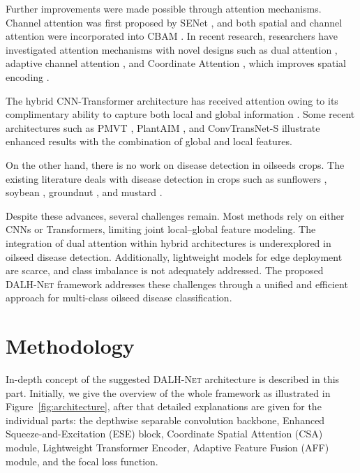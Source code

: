 \documentclass[default, iicol]{sn-jnl}
\theoremstyle{thmstyleone}%
\theoremstyle{thmstyletwo}%
\theoremstyle{thmstylethree}%
\newcommand{\dalh}{\textsc{DALH-Net}}
\begin{document}
Further improvements were made possible through attention mechanisms. Channel attention was first proposed by SENet \cite{hu2018squeeze}, and both spatial and channel attention were incorporated into CBAM \cite{woo2018cbam}. In recent research, researchers have investigated attention mechanisms with novel designs such as dual attention \cite{zhang2024lightweight}, adaptive channel attention \cite{ma2024ercp}, and Coordinate Attention \cite{hou2021coordinate}, which improves spatial encoding \cite{chen2021dfcanet}.

The hybrid CNN-Transformer architecture has received attention owing to its complimentary ability to capture both local and global information \cite{khan2023hybrid,vaswani2017attention}. Some recent architectures such as PMVT \cite{li2023pmvt}, PlantAIM \cite{chai2025plantaim}, and ConvTransNet-S \cite{lee2024convtransnet} illustrate enhanced results with the combination of global and local features.

On the other hand, there is no work on disease detection in oilseeds crops. The existing literature deals with disease detection in crops such as sunflowers \cite{dergi2024sunflower,sara2022sunflower}, soybean \cite{yu2023recognition,yang2024recognition}, groundnut \cite{sivaganesan2024groundnut,vyas2023groundnut}, and mustard \cite{zhao2024canola}.

Despite these advances, several challenges remain. Most methods rely on either CNNs or Transformers, limiting joint local–global feature modeling. The integration of dual attention within hybrid architectures is underexplored in oilseed disease detection. Additionally, lightweight models for edge deployment are scarce, and class imbalance is not adequately addressed. The proposed \dalh{} framework addresses these challenges through a unified and efficient approach for multi-class oilseed disease classification.


\section{Methodology}\label{sec:methodology}

In-depth concept of the suggested \dalh{} architecture is described in this part. Initially, we give the overview of the whole framework as illustrated in Figure~\ref{fig:architecture}, after that detailed explanations are given for the individual parts: the depthwise separable convolution backbone, Enhanced Squeeze-and-Excitation (ESE) block, Coordinate Spatial Attention (CSA) module, Lightweight Transformer Encoder, Adaptive Feature Fusion (AFF) module, and the focal loss function.
\end{document}
